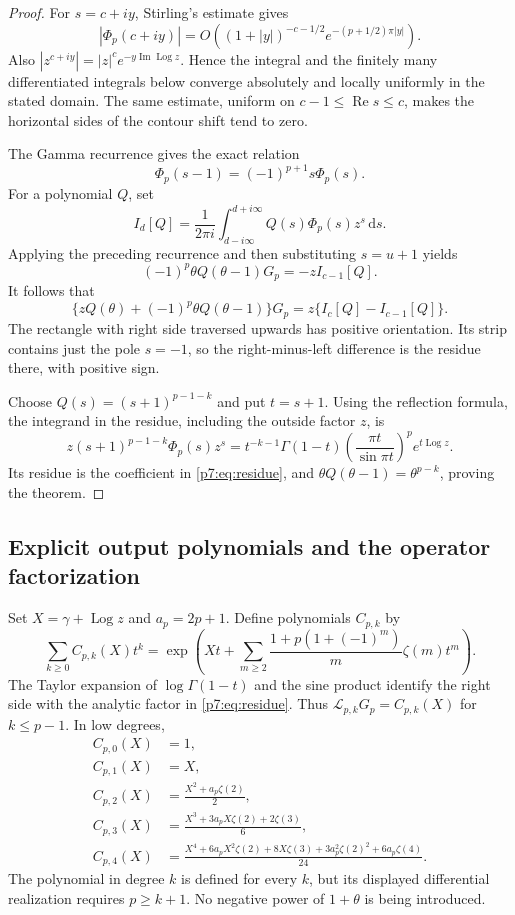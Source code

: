 \documentclass[11pt,a4paper]{article}
\theoremstyle{definition}
\theoremstyle{remark}
\newcommand{\dd}{\,\mathrm d}
\DeclareMathOperator{\Log}{Log}
\numberwithin{equation}{section}
\begin{document}
\begin{proof}
For $s=c+iy$, Stirling's estimate gives
\[
 |\Phi_p(c+iy)|
 =O\left((1+|y|)^{-c-1/2}
             e^{-(p+1/2)\pi|y|}\right).
\]
Also $|z^{c+iy}|=|z|^c e^{-y\operatorname{Im}\Log z}$. Hence the
integral and the finitely many differentiated integrals below converge
absolutely and locally uniformly in the stated domain. The same estimate,
uniform on $c-1\le\operatorname{Re}s\le c$, makes the horizontal sides
of the contour shift tend to zero.

The Gamma recurrence gives the exact relation
\[
 \Phi_p(s-1)=(-1)^{p+1}s\Phi_p(s).
\]
For a polynomial $Q$, set
\[
 I_d[Q]=\frac1{2\pi i}\int_{d-i\infty}^{d+i\infty}
                           Q(s)\Phi_p(s)z^s\dd s.
\]
Applying the preceding recurrence and then substituting $s=u+1$ yields
\[
 (-1)^p\theta Q(\theta-1)G_p=-zI_{c-1}[Q].
\]
It follows that
\begin{equation}
\label{p7:eq:shift-difference}
 \{zQ(\theta)+(-1)^p\theta Q(\theta-1)\}G_p
 =z\{I_c[Q]-I_{c-1}[Q]\}.
\end{equation}
The rectangle with right side traversed upwards has positive
orientation. Its strip contains just the pole $s=-1$, so the
right-minus-left difference is the residue there, with positive sign.

Choose $Q(s)=(s+1)^{p-1-k}$ and put $t=s+1$. Using the reflection
formula, the integrand in the residue, including the outside factor $z$,
is
\[
 z(s+1)^{p-1-k}\Phi_p(s)z^s
 =t^{-k-1}\Gamma(1-t)
      \left(\frac{\pi t}{\sin\pi t}\right)^p e^{t\Log z}.
\]
Its residue is the coefficient in \eqref{p7:eq:residue}, and
$\theta Q(\theta-1)=\theta^{p-k}$, proving the theorem.
\end{proof}

\subsection{Explicit output polynomials and the operator factorization}

Set $X=\gamma+\Log z$ and $a_p=2p+1$. Define polynomials $C_{p,k}$ by
\begin{equation}
\label{p7:eq:appell-generating}
 \sum_{k\ge0}C_{p,k}(X)t^k
 =
 \exp\left(
 Xt+\sum_{m\ge2}
       \frac{1+p(1+(-1)^m)}{m}\zeta(m)t^m
 \right).
\end{equation}
The Taylor expansion of $\log\Gamma(1-t)$ \cite{p7:DLMF5} and the sine
product identify the right side with the analytic factor in
\eqref{p7:eq:residue}. Thus $\mathcal L_{p,k}G_p=C_{p,k}(X)$ for
$k\le p-1$. In low degrees,
\begin{align*}
 C_{p,0}(X)&=1,\\
 C_{p,1}(X)&=X,\\
 C_{p,2}(X)&=\frac{X^2+a_p\zeta(2)}2,\\
 C_{p,3}(X)&=\frac{X^3+3a_pX\zeta(2)+2\zeta(3)}6,\\
 C_{p,4}(X)&=\frac{
 X^4+6a_pX^2\zeta(2)+8X\zeta(3)
 +3a_p^2\zeta(2)^2+6a_p\zeta(4)}{24}.
\end{align*}
The polynomial in degree $k$ is defined for every $k$, but its displayed
differential realization requires $p\ge k+1$. No negative power of
$1+\theta$ is being introduced.
\end{document}
